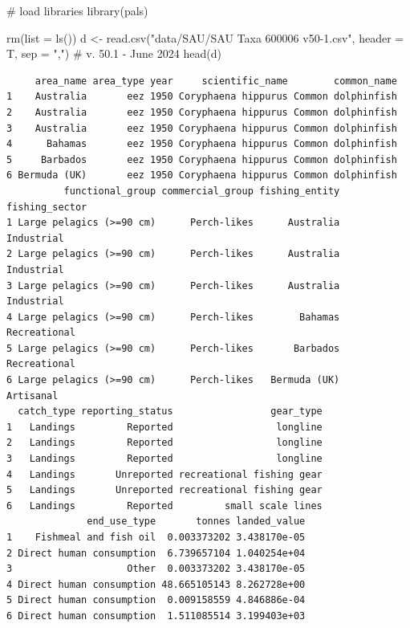 \documentclass[
  letterpaper,
  oneside,
  open=any]{scrbook}
\newenvironment{Shaded}{\begin{snugshade}}{\end{snugshade}}
\newcommand{\AttributeTok}[1]{\textcolor[rgb]{0.40,0.45,0.13}{#1}}
\newcommand{\CommentTok}[1]{\textcolor[rgb]{0.37,0.37,0.37}{#1}}
\newcommand{\FunctionTok}[1]{\textcolor[rgb]{0.28,0.35,0.67}{#1}}
\newcommand{\NormalTok}[1]{\textcolor[rgb]{0.00,0.23,0.31}{#1}}
\newcommand{\OtherTok}[1]{\textcolor[rgb]{0.00,0.23,0.31}{#1}}
\newcommand{\StringTok}[1]{\textcolor[rgb]{0.13,0.47,0.30}{#1}}
\begin{document}
\begin{Shaded}
\begin{Highlighting}[]
\CommentTok{\# load libraries}
\FunctionTok{library}\NormalTok{(pals)}

\FunctionTok{rm}\NormalTok{(}\AttributeTok{list =} \FunctionTok{ls}\NormalTok{())}
\NormalTok{d }\OtherTok{\textless{}{-}} \FunctionTok{read.csv}\NormalTok{(}\StringTok{"data/SAU/SAU Taxa 600006 v50{-}1.csv"}\NormalTok{, }\AttributeTok{header =}\NormalTok{ T, }\AttributeTok{sep =} \StringTok{","}\NormalTok{)  }\CommentTok{\# v. 50.1 {-} June 2024}
\FunctionTok{head}\NormalTok{(d)}
\end{Highlighting}
\end{Shaded}

\begin{verbatim}
     area_name area_type year     scientific_name        common_name
1    Australia       eez 1950 Coryphaena hippurus Common dolphinfish
2    Australia       eez 1950 Coryphaena hippurus Common dolphinfish
3    Australia       eez 1950 Coryphaena hippurus Common dolphinfish
4      Bahamas       eez 1950 Coryphaena hippurus Common dolphinfish
5     Barbados       eez 1950 Coryphaena hippurus Common dolphinfish
6 Bermuda (UK)       eez 1950 Coryphaena hippurus Common dolphinfish
          functional_group commercial_group fishing_entity fishing_sector
1 Large pelagics (>=90 cm)      Perch-likes      Australia     Industrial
2 Large pelagics (>=90 cm)      Perch-likes      Australia     Industrial
3 Large pelagics (>=90 cm)      Perch-likes      Australia     Industrial
4 Large pelagics (>=90 cm)      Perch-likes        Bahamas   Recreational
5 Large pelagics (>=90 cm)      Perch-likes       Barbados   Recreational
6 Large pelagics (>=90 cm)      Perch-likes   Bermuda (UK)      Artisanal
  catch_type reporting_status                 gear_type
1   Landings         Reported                  longline
2   Landings         Reported                  longline
3   Landings         Reported                  longline
4   Landings       Unreported recreational fishing gear
5   Landings       Unreported recreational fishing gear
6   Landings         Reported         small scale lines
              end_use_type       tonnes landed_value
1    Fishmeal and fish oil  0.003373202 3.438170e-05
2 Direct human consumption  6.739657104 1.040254e+04
3                    Other  0.003373202 3.438170e-05
4 Direct human consumption 48.665105143 8.262728e+00
5 Direct human consumption  0.009158559 4.846886e-04
6 Direct human consumption  1.511085514 3.199403e+03
\end{verbatim}
\end{document}
